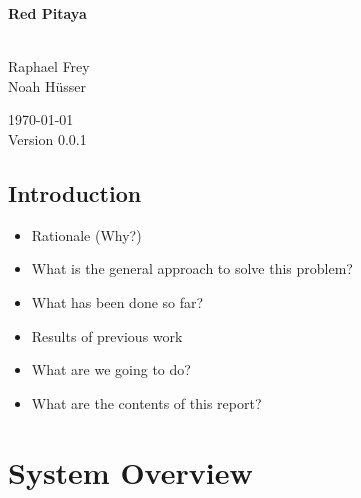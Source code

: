 \documentclass[a4paper,oneside]{alpenthesis/alpenthesis}
\begin{document}
\begin{titlingpage} %
    \flushright\sffamily

    \vspace*{5em}
    \Huge\bfseries{Red Pitaya}\\[1ex]
    \Large{}\\[3ex]

    \normalsize\mdseries
    
    \vfill
    Raphael Frey\\
    Noah H\"usser\\[3ex]

    \vspace{5em}

    \today\\
    Version 0.0.1
\end{titlingpage} %

\frontmatter %
\tableofcontents*
\clearpage
\listoffigures*
\clearpage
\listoftables*
\clearpage
\listoflistings
\clearpage

\mainmatter

\chapter{Introduction} %
\label{ch:intro}

\begin{itemize}\firmlist
    \item Rationale (Why?)
    \item What is the general approach to solve this problem?
    \item What has been done so far?
    \item Results of previous work
    \item What are we going to do?
    \item What are the contents of this report?
\end{itemize}


\part{System Overview} %
\label{part:System_Overview}
\end{document}
